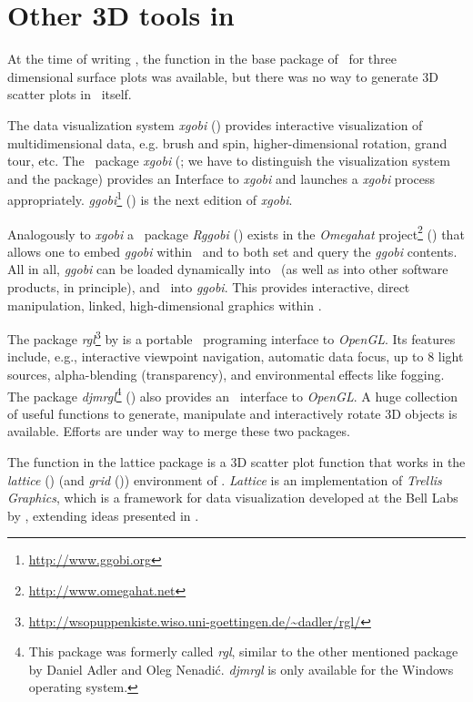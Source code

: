 \section{Other 3D tools in \RR\label{tools}}
At the time of writing \sdd , the function  in the base
package of \RR\ for three dimensional surface plots was available, but
there was no way to generate 3D scatter plots in \RR\ itself.

The data visualization system \emph{xgobi} (\cite{swayne98}) provides
interactive visualization of multidimensional data, e.g. brush and spin,
higher-dimensional rotation, grand tour, etc.  The \RR\ package
\emph{xgobi} (\cite{swayne91}; we have to distinguish the visualization
system and the package) provides an Interface to \emph{xgobi} and launches
a \emph{xgobi} process appropriately.
\emph{ggobi}\footnote{\url{http://www.ggobi.org}}
(\cite{swayne02}) is the next edition of \emph{xgobi}.

Analogously to \emph{xgobi} a \RR\ package \emph{Rggobi} (\cite{temple01})
exists in the \emph{Omegahat} project\footnote{\url{http://www.omegahat.net}}
(\cite{temple00}) that allows one to embed \emph{ggobi} within
\RR\ and to both set and query the \emph{ggobi} contents.  All in all,
\emph{ggobi} can be loaded dynamically into \RR\ (as well as into other
software products, in principle), and \RR\ into \emph{ggobi}.  This
provides interactive, direct manipulation, linked, high-dimensional
graphics within \RR .

The package \emph{rgl}\footnote{\url{http://wsopuppenkiste.wiso.uni-goettingen.de/~dadler/rgl/}}
by \cite{AdlerNenadic2003} is a portable \RR\ programing interface to \emph{OpenGL}.
Its features include, e.g., interactive viewpoint navigation,
automatic data focus, up to 8 light sources, alpha-blending
(transparency), and environmental effects like fogging.
The package \emph{djmrgl}\footnote{This package was
formerly called \emph{rgl}, similar to the other mentioned package
by Daniel Adler and Oleg Nenadi\'{c}.
\emph{djmrgl} is only available for the Windows operating system.}
(\cite{murdoch}) also provides an \RR\ interface to \emph{OpenGL}.
A huge collection of useful functions to generate,
manipulate and interactively rotate 3D objects is available.
Efforts are under way to merge these two packages.

The function  in the lattice package is a 3D scatter plot function that works in the
\emph{lattice} (\cite{sarkar02}) (and \emph{grid} (\cite{murrell01}))
environment of \RR .
\emph{Lattice} is an implementation of \emph{Trellis Graphics}, which is a
framework for data visualization developed at the Bell Labs by
, extending ideas presented in .

